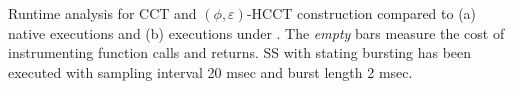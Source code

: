 \label{fig:hcct-slowdown} Runtime analysis for CCT and $(\phi,\varepsilon)$-HCCT construction compared to (a) native executions and (b) executions under \gprof. The {\em empty} bars measure the cost of instrumenting function calls and returns. SS with stating bursting has been executed with sampling interval 20 msec and burst length 2 msec.
